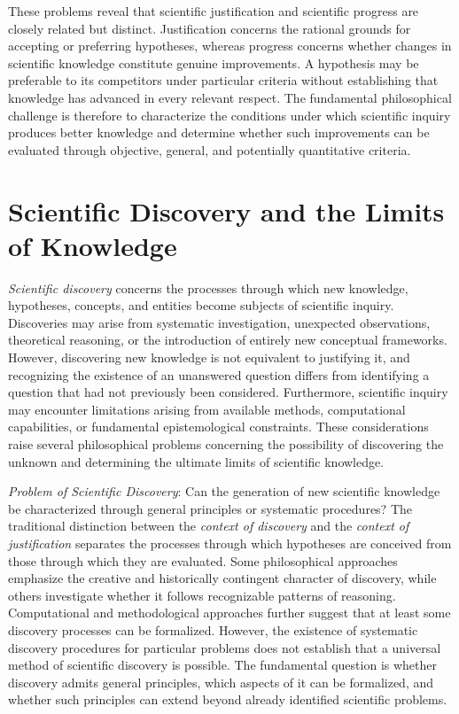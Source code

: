 These problems reveal that scientific justification and scientific progress are closely related but distinct. Justification concerns the rational grounds for accepting or preferring hypotheses, whereas progress concerns whether changes in scientific knowledge constitute genuine improvements. A hypothesis may be preferable to its competitors under particular criteria without establishing that knowledge has advanced in every relevant respect. The fundamental philosophical challenge is therefore to characterize the conditions under which scientific inquiry produces better knowledge and determine whether such improvements can be evaluated through objective, general, and potentially quantitative criteria.

%
%

\section{Scientific Discovery and the Limits of Knowledge}
\label{sec:scientific_discovery}

\emph{Scientific discovery} concerns the processes through which new knowledge, hypotheses, concepts, and entities become subjects of scientific inquiry. Discoveries may arise from systematic investigation, unexpected observations, theoretical reasoning, or the introduction of entirely new conceptual frameworks. However, discovering new knowledge is not equivalent to justifying it, and recognizing the existence of an unanswered question differs from identifying a question that had not previously been considered. Furthermore, scientific inquiry may encounter limitations arising from available methods, computational capabilities, or fundamental epistemological constraints. These considerations raise several philosophical problems concerning the possibility of discovering the unknown and determining the ultimate limits of scientific knowledge.

\emph{Problem of Scientific Discovery}: Can the generation of new scientific knowledge be characterized through general principles or systematic procedures? The traditional distinction between the \emph{context of discovery} and the \emph{context of justification} separates the processes through which hypotheses are conceived from those through which they are evaluated. Some philosophical approaches emphasize the creative and historically contingent character of discovery, while others investigate whether it follows recognizable patterns of reasoning. Computational and methodological approaches further suggest that at least some discovery processes can be formalized. However, the existence of systematic discovery procedures for particular problems does not establish that a universal method of scientific discovery is possible. The fundamental question is whether discovery admits general principles, which aspects of it can be formalized, and whether such principles can extend beyond already identified scientific problems.

